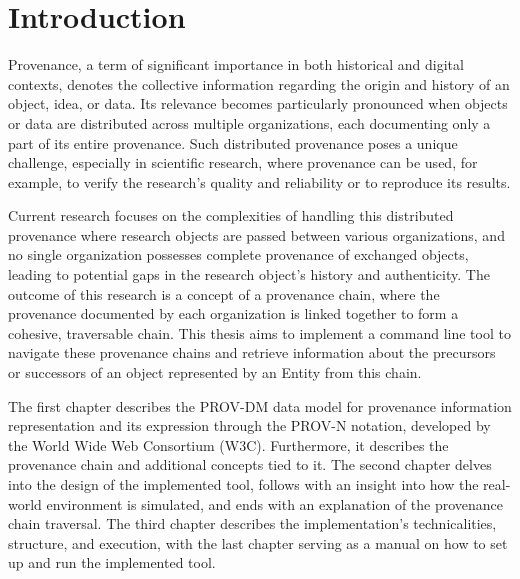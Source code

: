 \documentclass[
  digital,     %
  oneside,     %
  nosansbold,  %
  nocolorbold, %
  lof,         %
  lot,         %
]{fithesis4}
\begin{document}
\chapter*{Introduction}
\shorthandoff{-}
Provenance, a term of significant importance in both historical and digital contexts, denotes the collective information regarding the origin and history of an object, idea, or data. Its relevance becomes particularly pronounced when objects or data are distributed across multiple organizations, each documenting only a part of its entire provenance. Such distributed provenance poses a unique challenge, especially in scientific research, where provenance can be used, for example, to verify the research's quality and reliability or to reproduce its results.

Current research \cite{research} focuses on the complexities of handling this distributed provenance where research objects are passed between various organizations, and no single organization possesses complete provenance of exchanged objects, leading to potential gaps in the research object's history and authenticity. The outcome of this research is a concept of a provenance chain, where the provenance documented by each organization is linked together to form a cohesive, traversable chain. This thesis aims to implement a command line tool to navigate these provenance chains and retrieve information about the precursors or successors of an object represented by an Entity from this chain. 

The first chapter describes the PROV-DM data model for provenance information representation and its expression through the PROV-N notation, developed by the World Wide Web Consortium (W3C). Furthermore, it describes the provenance chain and additional concepts tied to it. The second chapter delves into the design of the implemented tool, follows with an insight into how the real-world environment is simulated, and ends with an explanation of the provenance chain traversal. The third chapter describes the implementation's technicalities, structure, and execution, with the last chapter serving as a manual on how to set up and run the implemented tool.
\shorthandon{-}
\end{document}
